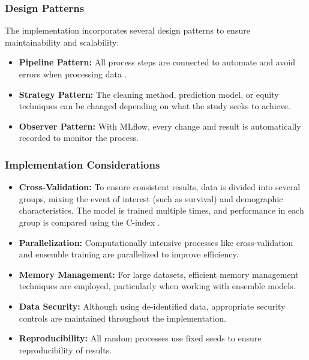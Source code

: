 \subsubsection{Design Patterns}

The implementation incorporates several design patterns to ensure maintainability and scalability:

\begin{itemize}
    \item \textbf{Pipeline Pattern:} All process steps are connected to automate and avoid errors when processing data \cite{datacamp_mlops}.
    
    \item \textbf{Strategy Pattern:} The cleaning method, prediction model, or equity techniques can be changed depending on what the study seeks to achieve.
    
    \item \textbf{Observer Pattern:} With MLflow, every change and result is automatically recorded to monitor the process.
\end{itemize}

\subsubsection{Implementation Considerations}

\begin{itemize}
    \item \textbf{Cross-Validation:} To ensure consistent results, data is divided into several groups, mixing the event of interest (such as survival) and demographic characteristics. The model is trained multiple times, and performance in each group is compared using the C-index \cite{scikit_learn_cv}.
    
    \item \textbf{Parallelization:} Computationally intensive processes like cross-validation and ensemble training are parallelized to improve efficiency.
    
    \item \textbf{Memory Management:} For large datasets, efficient memory management techniques are employed, particularly when working with ensemble models.
    
    \item \textbf{Data Security:} Although using de-identified data, appropriate security controls are maintained throughout the implementation.
    
    \item \textbf{Reproducibility:} All random processes use fixed seeds to ensure reproducibility of results.
\end{itemize}


